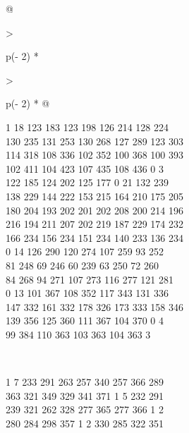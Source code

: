 \begin{question}
\begin{longtable}[]{@{}

  >{\raggedright\arraybackslash}p{(\columnwidth - 2\tabcolsep) * }

  >{\raggedright\arraybackslash}p{(\columnwidth - 2\tabcolsep) * }@{}}
\begin{minipage}[t]{\linewidth}
1 18 123 183 123 198 126 214 128 224\\

130 235 131 253 130 268 127 289 123 303\\

114 318 108 336 102 352 100 368 100 393\\

102 411 104 423 107 435 108 436 0 3\\

122 185 124 202 125 177 0 21 132 239\\

138 229 144 222 153 215 164 210 175 205\\

180 204 193 202 201 202 208 200 214 196\\

216 194 211 207 202 219 187 229 174 232\\

166 234 156 234 151 234 140 233 136 234\\

0 14 126 290 120 274 107 259 93 252\\

81 248 69 246 60 239 63 250 72 260\\

84 268 94 271 107 273 116 277 121 281\\

0 13 101 367 108 352 117 343 131 336\\

147 332 161 332 178 326 173 333 158 346\\

139 356 125 360 111 367 104 370 0 4\\

99 384 110 363 103 363 104 363 3\strut

\end{minipage} \\

\begin{minipage}[t]{\linewidth}\raggedright

1 7 233 291 263 257 340 257 366 289\\

363 321 349 329 341 371 1 5 232 291\\

239 321 262 328 277 365 277 366 1 2\\

280 284 298 357 1 2 330 285 322 351\\


\end{minipage}
\end{longtable}
\end{question}
